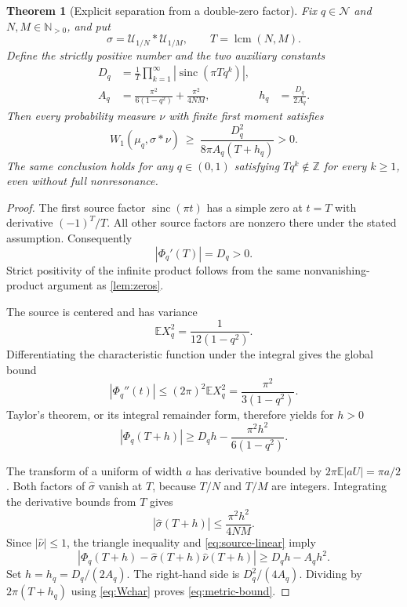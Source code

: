 \documentclass[11pt,letterpaper]{article}
\newtheorem{theorem}{Theorem}[section]
\theoremstyle{definition}
\theoremstyle{remark}
\newcommand{\Np}{\mathbb N_{>0}}
\newcommand{\Z}{\mathbb Z}
\newcommand{\E}{\mathbb E}
\newcommand{\Un}{\mathcal U}
\newcommand{\NR}{\mathcal N}
\newcommand{\sinc}{\operatorname{sinc}}
\newcommand{\lcm}{\operatorname{lcm}}
\numberwithin{equation}{section}
\begin{document}
\begin{theorem}[Explicit separation from a double-zero factor]\label{thm:metric}
Fix $q\in\NR$ and $N,M\in\Np$, and put
\[
 \sigma=\Un_{1/N}*\Un_{1/M},\qquad T=\lcm(N,M).
\]
Define the strictly positive number and the two auxiliary constants
\begin{align}
 D_q&=\frac1T\prod_{k=1}^{\infty}|\sinc(\pi Tq^k)|,\label{eq:D}\\
 A_q&=\frac{\pi^2}{6(1-q^2)}+\frac{\pi^2}{4NM},
 & h_q&=\frac{D_q}{2A_q}.\label{eq:Ah}
\end{align}
Then every probability measure $\nu$ with finite first moment satisfies
\begin{equation}\label{eq:metric-bound}
 W_1(\mu_q,\sigma*\nu)
 \ \ge\ \frac{D_q^2}{8\pi A_q(T+h_q)}>0.
\end{equation}
The same conclusion holds for any $q\in(0,1)$ satisfying $Tq^k\notin\Z$ for every $k\ge1$, even without full nonresonance.
\end{theorem}
\begin{proof}
The first source factor $\sinc(\pi t)$ has a simple zero at $t=T$ with derivative $(-1)^T/T$. All other source factors are nonzero there under the stated assumption. Consequently
\[
 |\Phi_q'(T)|=D_q>0.
\]
Strict positivity of the infinite product follows from the same nonvanishing-product argument as \cref{lem:zeros}.

The source is centered and has variance
\[
 \E X_q^2=\frac1{12(1-q^2)}.
\]
Differentiating the characteristic function under the integral gives the global bound
\[
 |\Phi_q''(t)|\le(2\pi)^2\E X_q^2
 =\frac{\pi^2}{3(1-q^2)}.
\]
Taylor's theorem, or its integral remainder form, therefore yields for $h>0$
\begin{equation}\label{eq:source-linear}
 |\Phi_q(T+h)|\ge D_qh-\frac{\pi^2h^2}{6(1-q^2)}.
\end{equation}

The transform of a uniform of width $a$ has derivative bounded by
$2\pi\E|aU|=\pi a/2$. Both factors of $\widehat\sigma$ vanish at $T$, because $T/N$ and $T/M$ are integers. Integrating the derivative bounds from $T$ gives
\[
 |\widehat\sigma(T+h)|\le\frac{\pi^2h^2}{4NM}.
\]
Since $|\widehat\nu|\le1$, the triangle inequality and \eqref{eq:source-linear} imply
\[
 |\Phi_q(T+h)-\widehat\sigma(T+h)\widehat\nu(T+h)|
 \ge D_qh-A_qh^2.
\]
Set $h=h_q=D_q/(2A_q)$. The right-hand side is $D_q^2/(4A_q)$. Dividing by $2\pi(T+h_q)$ using \eqref{eq:Wchar} proves \eqref{eq:metric-bound}.
\end{proof}
\end{document}
